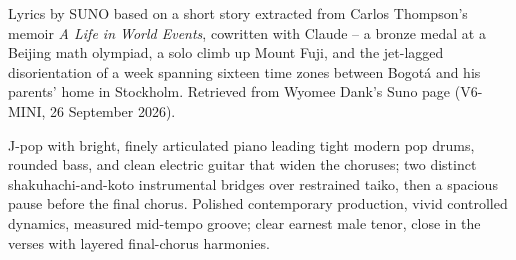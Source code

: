 
\begin{notes}
Lyrics by SUNO based on a short story extracted from Carlos Thompson's memoir \emph{A Life in World Events}, cowritten with Claude -- a bronze medal at a Beijing math olympiad, a solo climb up Mount Fuji, and the jet-lagged disorientation of a week spanning sixteen time zones between Bogotá and his parents' home in Stockholm. Retrieved from Wyomee Dank's Suno page (V6-MINI, 26 September 2026).
\end{notes}
\begin{style}
J-pop with bright, finely articulated piano leading tight modern pop drums, rounded bass, and clean electric guitar that widen the choruses; two distinct shakuhachi-and-koto instrumental bridges over restrained taiko, then a spacious pause before the final chorus. Polished contemporary production, vivid controlled dynamics, measured mid-tempo groove; clear earnest male tenor, close in the verses with layered final-chorus harmonies.
\end{style}
